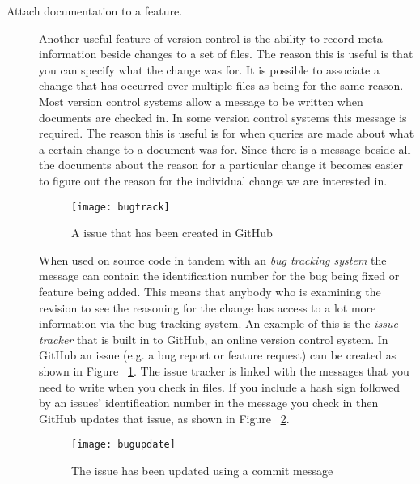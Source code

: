 \begin{description}
  \item [Attach documentation to a feature.]
  Another useful feature of version control is the ability to record meta information beside changes to a set of files.
  The reason this is useful is that you can specify what the change was for.
  It is possible to associate a change that has occurred over multiple files as being for the same reason.
  Most version control systems allow a message to be written when documents are checked in.
  In some version control systems this message is required.
  The reason this is useful is for when queries are made about what a certain change to a document was for.
  Since there is a message beside all the documents about the reason for a particular change it becomes easier to figure out the reason for the individual change we are interested in. 

  \begin{figure}[!t]
   \begin{center}
    \texttt{[image: bugtrack]}
   \end{center}
   \caption{A issue that has been created in GitHub}
   \label{fig:bgBugTrack}
  \end{figure}

  When used on source code in tandem with an \emph{bug tracking system} the message can contain the identification number for the bug being fixed or feature being added.
  This means that anybody who is examining the revision to see the reasoning for the change has access to a lot more information via the bug tracking system.
  An example of this is the \emph{issue tracker} that is built in to GitHub, an online version control system. In GitHub an issue (e.g. a bug report or feature request) can be created as shown in Figure ~\ref{fig:bgBugTrack}. 
  The issue tracker is linked with the messages that you need to write when you check in files.
  If you include a hash sign followed by an issues' identification number in the message you check in then GitHub updates that issue, as shown in Figure ~\ref{fig:bgBugUpdate}.

  \begin{figure}[!t]
   \begin{center}
    \texttt{[image: bugupdate]}
   \end{center}
   \caption{The issue has been updated using a commit message}
   \label{fig:bgBugUpdate}
  \end{figure}


\end{description}
